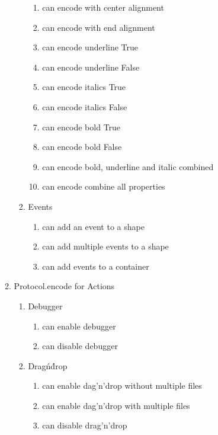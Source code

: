 \begin{enumerate}[label={T\arabic*}]
\begin{enumerate}[label={T\arabic{enumi}.\arabic*}]
\begin{enumerate}[label={T\arabic{enumi}.\arabic{enumii}.\arabic*}]
\begin{enumerate}[label={T\arabic{enumi}.\arabic{enumii}.\arabic{enumiii}.\arabic*}]
            	\item can encode with center alignment
            	\item can encode with end alignment
            	\item can encode underline True
            	\item can encode underline False
            	\item can encode italics True
            	\item can encode italics False
            	\item can encode bold True
            	\item can encode bold False
            	\item can encode bold, underline and italic combined
            	\item can encode combine all properties
            \end{enumerate}
	        \item Events
	        \begin{enumerate}[label={T\arabic{enumi}.\arabic{enumii}.\arabic{enumiii}.\arabic*}]
            	\item can add an event to a shape
            	\item can add multiple events to a shape
            	\item can add events to a container
            \end{enumerate}
        \end{enumerate}
	    \item Protocol.encode for Actions
	    \begin{enumerate}[label={T\arabic{enumi}.\arabic{enumii}.\arabic*}]
	        \item Debugger
	        \begin{enumerate}[label={T\arabic{enumi}.\arabic{enumii}.\arabic{enumiii}.\arabic*}]
            	\item can enable debugger
            	\item can disable debugger
            \end{enumerate}
            \item Drag\'n\'drop
	        \begin{enumerate}[label={T\arabic{enumi}.\arabic{enumii}.\arabic{enumiii}.\arabic*}]
            	\item can enable dag'n'drop without multiple files
            	\item can enable dag'n'drop with multiple files
            	\item can disable drag'n'drop

\end{enumerate}
\end{enumerate}
\end{enumerate}
\end{enumerate}
